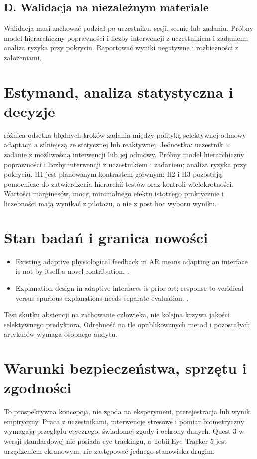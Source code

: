 \documentclass[11pt,a4paper]{article}
\begin{document}
\subsection{D. Walidacja na niezależnym materiale}
Walidacja musi zachować podział po uczestniku, sesji, scenie lub zadaniu. Próbny model hierarchiczny poprawności i liczby interwencji z uczestnikiem i zadaniem; analiza ryzyka przy pokryciu. Raportować wyniki negatywne i rozbieżności z założeniami.
\section{Estymand, analiza statystyczna i decyzje}
różnica odsetka błędnych kroków zadania między polityką selektywnej odmowy adaptacji a silniejszą ze statycznej lub reaktywnej. Jednostka: uczestnik × zadanie z możliwością interwencji lub jej odmowy. Próbny model hierarchiczny poprawności i liczby interwencji z uczestnikiem i zadaniem; analiza ryzyka przy pokryciu. H1 jest planowanym kontrastem głównym; H2 i H3 pozostają pomocnicze do zatwierdzenia hierarchii testów oraz kontroli wielokrotności. Wartości marginesów, mocy, minimalnego efektu istotnego praktycznie i liczebności mają wynikać z pilotażu, a nie z post hoc wyboru wyniku.
\section{Stan badań i granica nowości}
\begin{itemize}
\item Existing adaptive physiological feedback in AR means adapting an interface is not by itself a novel contribution. \cite{xrprior1}.
\item Explanation design in adaptive interfaces is prior art; response to veridical versus spurious explanations needs separate evaluation. \cite{xrprior2}.
\end{itemize}
Test skutku abstencji na zachowanie człowieka, nie kolejna krzywa jakości selektywnego predyktora. Odrębność na tle opublikowanych metod i pozostałych artykułów wymaga osobnego audytu.
\section{Warunki bezpieczeństwa, sprzętu i zgodności}
To prospektywna koncepcja, nie zgoda na eksperyment, prerejestracja lub wynik empiryczny. Praca z uczestnikami, interwencje stresowe i pomiar biometryczny wymagają przeglądu etycznego, świadomej zgody i ochrony danych. Quest 3 w wersji standardowej nie posiada eye trackingu, a Tobii Eye Tracker 5 jest urządzeniem ekranowym; nie zastępować jednego stanowiska drugim.
\end{document}
